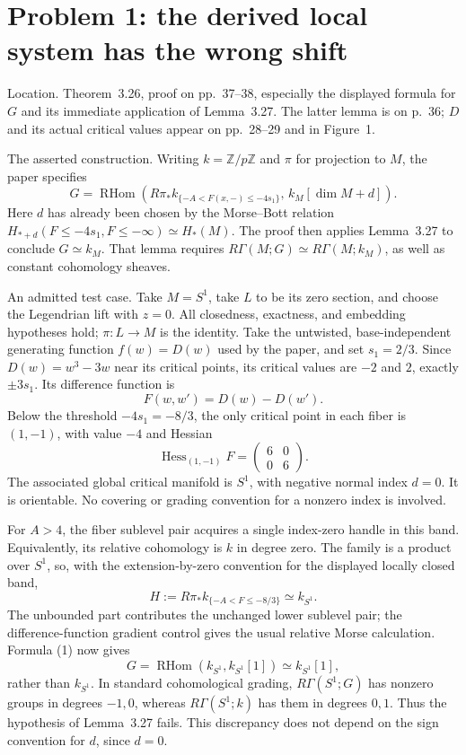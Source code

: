 \documentclass[10pt]{article}
\begin{document}
\section*{Problem 1: the derived local system has the wrong shift}
Location. Theorem 3.26, proof on pp. 37–38, especially the displayed formula for \(G\) and its immediate application of Lemma 3.27. The latter lemma is on p. 36; \(D\) and its actual critical values appear on pp. 28–29 and in Figure 1.\par
The asserted construction. Writing \(k=\mathbb Z/p\mathbb Z\) and \(\pi\) for projection to \(M\), the paper specifies \[G=\operatorname{RHom}\!\left(R\pi_*
 k_{\{-A<F(x,-)\le-4s_1\}},\,k_M[\dim M+d]\right).
 \tag{1}\] Here \(d\) has already been chosen by the Morse–Bott relation \(H_{*+d}(F\le-4s_1,F\le-\infty)\simeq H_*(M)\). The proof then applies Lemma 3.27 to conclude \(G\simeq k_M\). That lemma requires \(R\Gamma(M;G)\simeq R\Gamma(M;k_M)\), as well as constant cohomology sheaves.\par
An admitted test case. Take \(M=S^1\), take \(L\) to be its zero section, and choose the Legendrian lift with \(z=0\). All closedness, exactness, and embedding hypotheses hold; \(\pi:L\to M\) is the identity. Take the untwisted, base-independent generating function \(f(w)=D(w)\) used by the paper, and set \(s_1=2/3\). Since \(D(w)=w^3-3w\) near its critical points, its critical values are \(-2\) and \(2\), exactly \(\pm3s_1\). Its difference function is \[F(w,w')=D(w)-D(w').\] Below the threshold \(-4s_1=-8/3\), the only critical point in each fiber is \((1,-1)\), with value \(-4\) and Hessian \[\operatorname{Hess}_{(1,-1)}F=
 \begin{pmatrix}6&0\\0&6\end{pmatrix}.\] The associated global critical manifold is \(S^1\), with negative normal index \(d=0\). It is orientable. No covering or grading convention for a nonzero index is involved.\par
For \(A>4\), the fiber sublevel pair acquires a single index-zero handle in this band. Equivalently, its relative cohomology is \(k\) in degree zero. The family is a product over \(S^1\), so, with the extension-by-zero convention for the displayed locally closed band, \[H:=R\pi_*k_{\{-A<F\le-8/3\}}\simeq k_{S^1}.\] The unbounded part contributes the unchanged lower sublevel pair; the difference-function gradient control gives the usual relative Morse calculation. Formula (1) now gives \[G=\operatorname{RHom}(k_{S^1},k_{S^1}[1])\simeq k_{S^1}[1],
 \tag{2}\] rather than \(k_{S^1}\). In standard cohomological grading, \(R\Gamma(S^1;G)\) has nonzero groups in degrees \(-1,0\), whereas \(R\Gamma(S^1;k)\) has them in degrees \(0,1\). Thus the hypothesis of Lemma 3.27 fails. This discrepancy does not depend on the sign convention for \(d\), since \(d=0\).\par
\end{document}
